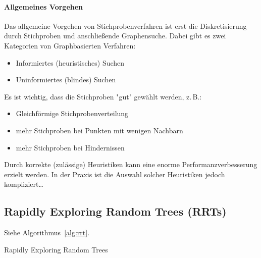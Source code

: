 			\paragraph{Allgemeines Vorgehen}
				Das allgemeine Vorgehen von Stichprobenverfahren ist erst die Diskretisierung durch Stichproben und anschließende Graphensuche. Dabei gibt es zwei Kategorien von Graphbasierten Verfahren:
				\begin{itemize}
					\item Informiertes (heuristisches) Suchen
					\item Uninformiertes (blindes) Suchen
				\end{itemize}
				Es ist wichtig, dass die Stichproben "gut" gewählt werden, z.\,B.:
				\begin{itemize}
					\item Gleichförmige Stichprobenverteilung
					\item mehr Stichproben bei Punkten mit wenigen Nachbarn
					\item mehr Stichproben bei Hindernissen
				\end{itemize}
			
				Durch korrekte (zulässige) Heuristiken kann eine enorme Performanzverbesserung erzielt werden. In der Praxis ist die Auswahl solcher Heuristiken jedoch kompliziert\dots

		\subsection{Rapidly Exploring Random Trees (RRTs)}
			Siehe Algorithmus~\ref{alg:rrt}.
			
			\begin{algorithm}
				\caption{Rapidly Exploring Random Trees}
				\label{alg:rrt}
			\end{algorithm}

